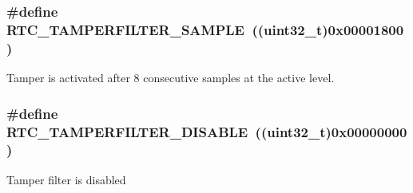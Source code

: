 \subsubsection[{\texorpdfstring{R\+T\+C\+\_\+\+T\+A\+M\+P\+E\+R\+F\+I\+L\+T\+E\+R\+\_\+8\+S\+A\+M\+P\+LE}{RTC_TAMPERFILTER_8SAMPLE}}]{\setlength{\rightskip}{0pt plus 5cm}\#define R\+T\+C\+\_\+\+T\+A\+M\+P\+E\+R\+F\+I\+L\+T\+E\+R\+\_\+S\+A\+M\+P\+LE~((uint32\+\_\+t)0x00001800)}\hypertarget{group___r_t_c_ex___tamper___filter___definitions_ga3689ed6d70107f0acc92aae8b13600bd}{}\label{group___r_t_c_ex___tamper___filter___definitions_ga3689ed6d70107f0acc92aae8b13600bd}
Tamper is activated after 8 consecutive samples at the active level. 
\subsubsection[{\texorpdfstring{R\+T\+C\+\_\+\+T\+A\+M\+P\+E\+R\+F\+I\+L\+T\+E\+R\+\_\+\+D\+I\+S\+A\+B\+LE}{RTC_TAMPERFILTER_DISABLE}}]{\setlength{\rightskip}{0pt plus 5cm}\#define R\+T\+C\+\_\+\+T\+A\+M\+P\+E\+R\+F\+I\+L\+T\+E\+R\+\_\+\+D\+I\+S\+A\+B\+LE~((uint32\+\_\+t)0x00000000)}\hypertarget{group___r_t_c_ex___tamper___filter___definitions_ga0809aebfef5642f8f2a8d04b0aed4d98}{}\label{group___r_t_c_ex___tamper___filter___definitions_ga0809aebfef5642f8f2a8d04b0aed4d98}
Tamper filter is disabled 